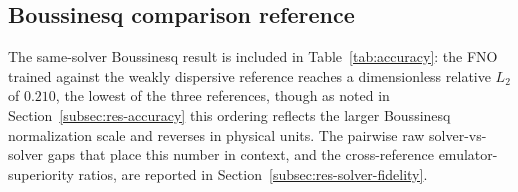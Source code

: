 \subsection{Boussinesq comparison reference}
\label{subsec:res-boussinesq}
The same-solver Boussinesq result is included in Table~\ref{tab:accuracy}: the FNO trained against the weakly dispersive reference reaches a dimensionless relative $L_2$ of $0.210$, the lowest of the three references, though as noted in Section~\ref{subsec:res-accuracy} this ordering reflects the larger Boussinesq normalization scale and reverses in physical units. The pairwise raw solver-vs-solver gaps that place this number in context, and the cross-reference emulator-superiority ratios, are reported in Section~\ref{subsec:res-solver-fidelity}.
